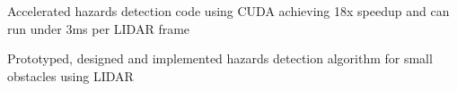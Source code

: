 \documentclass[]{deedy-resume-openfont}
\begin{document}
\begin{minipage}[t]{0.69\textwidth}
\vspace{\topsep} %
\begin{tightemize}
\item Accelerated hazards detection code using CUDA achieving 18x speedup and can run under 3ms per LIDAR frame
\end{tightemize}
\sectionsep

\vspace{\topsep} %
\begin{tightemize}
\item Prototyped, designed and implemented hazards detection algorithm for small obstacles using LIDAR
\end{tightemize}
\sectionsep


\end{minipage}
\end{document}

